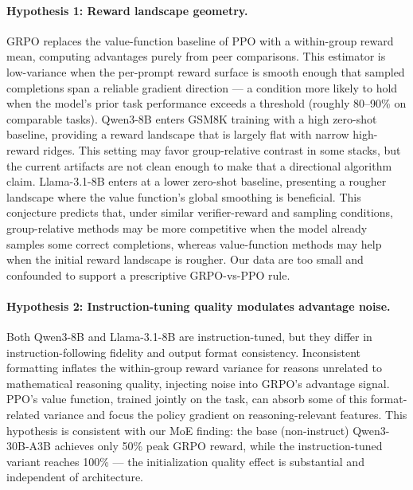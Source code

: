 \documentclass{article}
\begin{document}
\paragraph{Hypothesis 1: Reward landscape geometry.}
GRPO replaces the value-function baseline of PPO with a within-group reward
mean, computing advantages purely from peer comparisons.
This estimator is low-variance when the per-prompt reward surface is smooth
enough that sampled completions span a reliable gradient direction --- a
condition more likely to hold when the model's prior task performance exceeds a
threshold (roughly 80--90\% on comparable tasks).
Qwen3-8B enters GSM8K training with a high zero-shot baseline, providing a
reward landscape that is largely flat with narrow high-reward ridges.  This
setting may favor group-relative contrast in some stacks, but the current
artifacts are not clean enough to make that a directional algorithm claim.
Llama-3.1-8B enters at a lower zero-shot baseline, presenting a rougher
landscape where the value function's global smoothing is beneficial.
This conjecture predicts that, under similar verifier-reward and sampling
conditions, group-relative methods may be more competitive when the model
already samples some correct completions, whereas value-function methods may
help when the initial reward landscape is rougher. Our data are too small and
confounded to support a prescriptive GRPO-vs-PPO rule.

\paragraph{Hypothesis 2: Instruction-tuning quality modulates advantage noise.}
Both Qwen3-8B and Llama-3.1-8B are instruction-tuned, but they differ in
instruction-following fidelity and output format consistency.
Inconsistent formatting inflates the within-group reward variance for reasons
unrelated to mathematical reasoning quality, injecting noise into GRPO's
advantage signal.
PPO's value function, trained jointly on the task, can absorb some of this
format-related variance and focus the policy gradient on reasoning-relevant
features.
This hypothesis is consistent with our MoE finding: the base (non-instruct)
Qwen3-30B-A3B achieves only 50\% peak GRPO reward, while the instruction-tuned
variant reaches 100\% --- the initialization quality effect is substantial and
independent of architecture.
\end{document}
